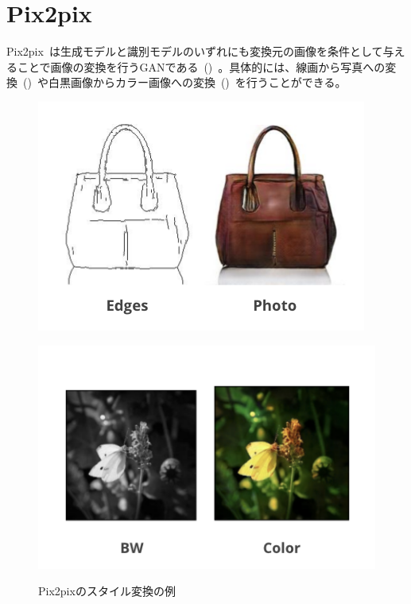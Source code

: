 \clearpage

\section{Pix2pix}

Pix2pix~\cite{pix2pix}は生成モデルと識別モデルのいずれにも変換元の画像を条件として与えることで画像の変換を行うGANである~()~。具体的には、線画から写真への変換~()~や白黒画像からカラー画像への変換~()~を行うことができる。

\begin{figure}[b]
\centering
\begin{minipage}[b]{0.48\columnwidth}
\centering
\includegraphics[width=0.8\columnwidth]{figure/EP.png}
\label{fig:pix2pix_img1}
\end{minipage}
\begin{minipage}[b]{0.48\columnwidth}
\centering
\includegraphics[width=0.8\columnwidth]{figure/BWC.png}
\label{fig:pix2pix_img2}
\end{minipage}
\caption{Pix2pixのスタイル変換の例}
\label{fig:pix2pix_img}
\end{figure}

